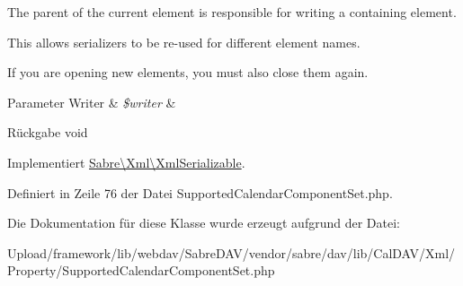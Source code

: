The parent of the current element is responsible for writing a containing element.

This allows serializers to be re-\/used for different element names.

If you are opening new elements, you must also close them again.


\begin{DoxyParams}[1]{Parameter}
Writer & {\em \$writer} & \\
\hline
\end{DoxyParams}
\begin{DoxyReturn}{Rückgabe}
void 
\end{DoxyReturn}


Implementiert \mbox{\hyperlink{interface_sabre_1_1_xml_1_1_xml_serializable_aa78f3ee43aa699be8347181653a53d8c}{Sabre\textbackslash{}\+Xml\textbackslash{}\+Xml\+Serializable}}.



Definiert in Zeile 76 der Datei Supported\+Calendar\+Component\+Set.\+php.



Die Dokumentation für diese Klasse wurde erzeugt aufgrund der Datei\+:\begin{DoxyCompactItemize}
\item 
Upload/framework/lib/webdav/\+Sabre\+D\+A\+V/vendor/sabre/dav/lib/\+Cal\+D\+A\+V/\+Xml/\+Property/Supported\+Calendar\+Component\+Set.\+php\end{DoxyCompactItemize}
